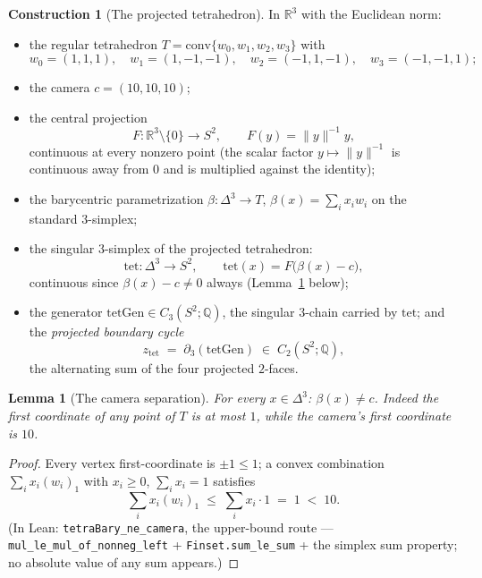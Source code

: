 \documentclass[11pt,a4paper]{article}
\theoremstyle{plain}
\newtheorem{lemma}[theorem]{Lemma}
\theoremstyle{definition}
\newtheorem{construction}[theorem]{Construction}
\newcommand{\Q}{\mathbb{Q}}
\newcommand{\R}{\mathbb{R}}
\begin{document}
\begin{construction}[The projected tetrahedron]
\label{con:tetra}
In $\R^3$ with the Euclidean norm:
\begin{itemize}
\item the regular tetrahedron $T = \mathrm{conv}\{w_0, w_1, w_2,
w_3\}$ with
\[
w_0 = (1,1,1),\quad w_1 = (1,-1,-1),\quad w_2 = (-1,1,-1),\quad
w_3 = (-1,-1,1);
\]
\item the camera $c = (10,10,10)$;
\item the central projection
\[
F : \R^3 \setminus \{0\} \to S^2, \qquad F(y) = \|y\|^{-1} y ,
\]
continuous at every nonzero point (the scalar factor $y \mapsto
\|y\|^{-1}$ is continuous away from $0$ and is multiplied against the
identity);
\item the barycentric parametrization $\beta : \Delta^3 \to T$,
$\beta(x) = \sum_i x_i w_i$ on the standard $3$-simplex;
\item the singular $3$-simplex of the projected tetrahedron:
\[
\mathrm{tet} : \Delta^3 \to S^2, \qquad \mathrm{tet}(x) = F\bigl(
\beta(x) - c \bigr),
\]
continuous since $\beta(x) - c \ne 0$ always
(Lemma~\ref{lem:camera} below);
\item the generator $\mathrm{tetGen} \in C_3(S^2;\Q)$, the singular
$3$-chain carried by $\mathrm{tet}$; and the \emph{projected
boundary cycle}
\[
z_{\mathrm{tet}} \;=\; \partial_3(\mathrm{tetGen}) \;\in\;
C_2(S^2;\Q),
\]
the alternating sum of the four projected $2$-faces.
\end{itemize}
\end{construction}

\begin{lemma}[The camera separation]\label{lem:camera}
For every $x \in \Delta^3$: $\beta(x) \ne c$.  Indeed the first
coordinate of any point of $T$ is at most $1$, while the camera's
first coordinate is $10$.
\end{lemma}

\begin{proof}
Every vertex first-coordinate is $\pm 1 \le 1$; a convex combination
$\sum_i x_i (w_i)_1$ with $x_i \ge 0$, $\sum_i x_i = 1$ satisfies
\[
\sum_i x_i (w_i)_1 \;\le\; \sum_i x_i \cdot 1 \;=\; 1 \;<\; 10 .
\]
(In Lean: \texttt{tetraBary\_ne\_camera}, the upper-bound route ---
\texttt{mul\_le\_mul\_of\_nonneg\_left} + \texttt{Finset.sum\_le\_sum}
+ the simplex sum property; no absolute value of any sum appears.)
\end{proof}
\end{document}
